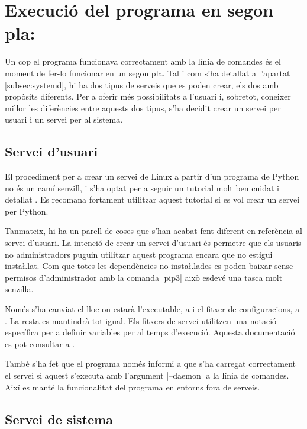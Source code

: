 \section{Execució del programa en segon pla: }

Un cop el programa funcionava correctament amb la línia de comandes és el moment
de fer-lo funcionar en un segon pla. Tal i com s'ha detallat a l'apartat
\ref{subsec:systemd}, hi ha dos tipus de serveis que es poden crear, els dos
amb propòsits diferents. Per a oferir més possibilitats a l'usuari i, sobretot,
coneixer millor les diferències entre aquests dos tipus, s'ha decidit crear
un servei per usuari i un servei per al sistema.

\subsection{Servei d'usuari}

El procediment per a crear un servei de Linux a partir d'un programa de Python
no és un camí senzill, i s'ha optat per a seguir un tutorial molt ben cuidat i
detallat \cite{PythonSystemdTutorial}. Es recomana fortament utilitzar aquest
tutorial si es vol crear un servei per Python.

Tanmateix, hi ha un parell de coses que s'han acabat fent diferent en referència
al servei d'usuari. La intenció de crear un servei d'usuari és permetre que els
usuaris no administradors puguin utilitzar aquest programa encara que no estigui
insta\l.lat. Com que totes les dependències no insta\l.lades es poden baixar
sense permisos d'administrador amb la comanda \ord|pip3| això esdevé una tasca
molt senzilla.

Només s'ha canviat el lloc on estarà l'executable, a  i el
fitxer de configuracions, a . La resta es mantindrà
tot igual. Els fitxers de servei utilitzen una notació específica per a
definir variables per al temps d'execució. Aquesta documentació es pot consultar
a \cite{mansystemd}.

També s'ha fet que el programa només informi a  que s'ha carregat
correctament el servei si aquest s'executa amb l'argument \ord|--daemon| a la
línia de comandes. Així es manté la funcionalitat del programa en entorns fora
de serveis.

\subsection{Servei de sistema}
\label{subsec:systemd_system}

